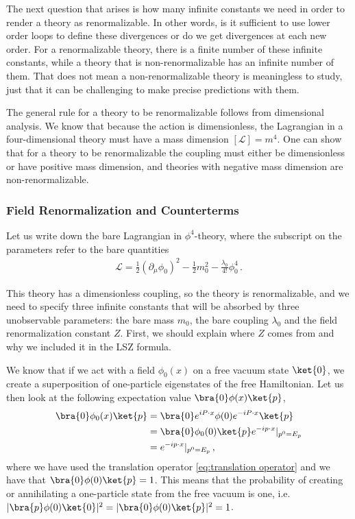 \medskip
The next question that arises is how many infinite constants we need in order to render a theory as renormalizable. In other words, is it sufficient to use lower order loops to define these divergences or do we get  divergences at each new order. For a renormalizable theory, there is a finite number of these infinite constants, while a theory that is non-renormalizable has an infinite number of them. That does not mean a non-renormalizable theory is meaningless to study, just that it can be challenging to make precise predictions with them.

The general rule for a theory to be renormalizable follows from dimensional analysis. We know that because the action is dimensionless, the Lagrangian in a four-dimensional theory must have a mass dimension $[\mathcal{L}]=m^{4}$. One can show that for a theory to be renormalizable the coupling must either be dimensionless or have positive mass dimension, and theories with negative mass dimension are non-renormalizable.

\subsubsection*{Field Renormalization and Counterterms}
Let us write down the bare Lagrangian in $\phi^{4}$-theory, where the subscript on the parameters refer to the bare quantities
\begin{align}
    \mathcal{L}=\frac{1}{2}(\partial_{\mu}\phi_{0})^{2}-\frac{1}{2}m_{0}^{2}-\frac{\lambda_{0}}{4!}\phi_{0}^{4}\,.
\end{align}

This theory has a dimensionless coupling, so the theory is renormalizable, and we need to specify three infinite constants that will be absorbed by three unobservable parameters: the bare mass $m_{0}$, the bare coupling $\lambda_{0}$ and the field renormalization constant $Z$. First, we should explain where $Z$ comes from and why we included it in the LSZ formula.

We know that if we act with a field $\phi_{0}(x)$ on a free vacuum state $\ket{0}$, we create a superposition of one-particle eigenstates of the free Hamiltonian. Let us then look at the following expectation value $\bra{0}\phi(x)\ket{p}$,
\begin{align}
    \bra{0}\phi_{0}(x)\ket{p}&=\bra{0}e^{iP\cdot x}\phi(0)e^{-iP\cdot x}\ket{p}\nonumber
    \\
    &=\bra{0}\phi_{0}(0)\ket{p}e^{-ip\cdot x}|_{p^{0}=E_{p}}\nonumber
    \\
    &=e^{-ip\cdot x}|_{p^{0}=E_{p}}\,,
\end{align}
where we have used the translation operator \cref{eq:translation operator} and we have that $\bra{0}\phi(0)\ket{p}=1$. This means that the probability of creating or annihilating a one-particle state from the free vacuum is one, i.e. $|\bra{p}\phi(0)\ket{0}|^{2}=|\bra{0}\phi(0)\ket{p}|^{2}=1$. 

